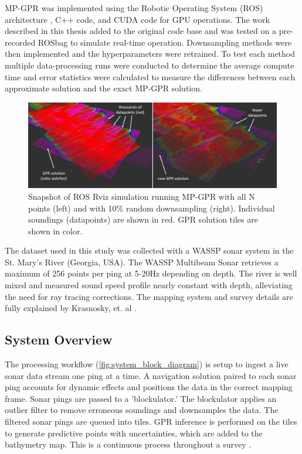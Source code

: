 MP-GPR was implemented using the Robotic Operating System (ROS) architecture \cite{ROS}, C++ code, and CUDA \cite{Cuda_runtime_api} code for GPU operations. The work described in this thesis added to the original code base and was tested on a pre-recorded ROSbag to simulate real-time operation. Downsampling methods were then implemented and the hyperparameters were retrained. To test each method multiple data-processing runs were conducted to determine the average compute time and error statistics were calculated to measure the differences between each approximate solution and the exact MP-GPR solution.     

\begin{figure}[!ht]
    \begin{center}
       \includegraphics[width=.75\textwidth]{images/gpr_N_vs_gpr_M_pts_random_downsample_10percent.jpg}
    \end{center}
    \caption{Snapshot of ROS Rviz simulation running MP-GPR with all N points (left) and with 10\% random downsampling (right). Individual soundings (datapoints) are shown in red. GPR solution tiles are shown in color.}
    \label{fig:ROS_10percent_downsample}
\end{figure}

The dataset used in this study was collected with a WASSP sonar system in the St. Mary's River (Georgia, USA). The WASSP Multibeam Sonar retrieves a maximum of 256 points per ping at 5-20Hz depending on depth. The river is well mixed and measured sound speed profile nearly constant with depth, alleviating the need for ray tracing corrections. The mapping system and survey details are fully explained by Krasnosky, et. al \cite{KrasnoskyPOS}. 

\subsection{System Overview}\label{sec:system_overview}

The processing workflow (\ref{fig:system_block_diagram}) is setup to ingest a live sonar data stream one ping at a time. A navigation solution paired to each sonar ping accounts for dynamic effects and positions the data in the correct mapping frame. Sonar pings are passed to a 'blockulator.' The blockulator applies an outlier filter to remove erroneous soundings and downsamples the data. The filtered sonar pings are queued into tiles. GPR inference is performed on the tiles to generate predictive points with uncertainties, which are added to the bathymetry map. This is a continuous process throughout a survey \cite{Krasnosky2022}. 

